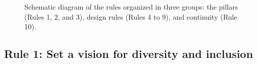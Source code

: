 \documentclass[10pt,letterpaper]{article}
\begin{document}
\begin{figure}[!h]
\centering
\caption{Schematic diagram of the rules organized in three groups: the pillars (Rules 1, 2, and 3), design rules (Rules 4 to 9), and continuity (Rule 10).}
\label{fig:diagram}
\end{figure}




\subsection*{Rule 1: Set a vision for diversity and inclusion}
\label{rule_diversity}
\end{document}
